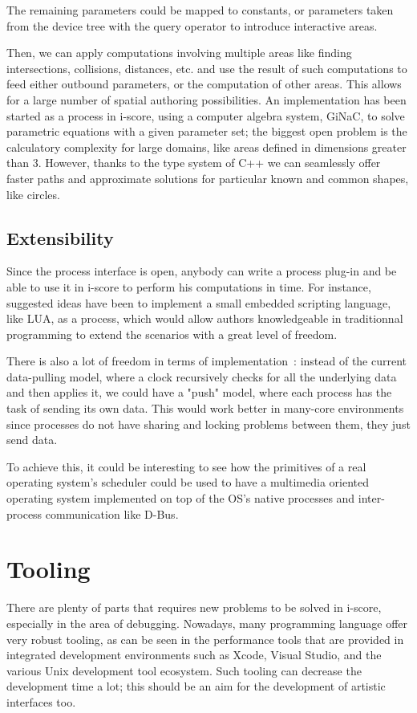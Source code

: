 \documentclass{sigchi}
\begin{document}
The remaining parameters could be mapped to constants, or parameters taken from the device tree with the query operator to introduce interactive areas.

Then, we can apply computations involving multiple areas like finding intersections, collisions, distances, etc. and use the result of such computations to feed either outbound parameters, or the computation of other areas. This allows for a large number of spatial authoring possibilities. An implementation has been started as a process in i-score, using a computer algebra system, GiNaC\cite{bauer2002introduction}, to solve parametric equations with a given parameter set; the biggest open problem is the calculatory complexity for large domains, like areas defined in dimensions greater than 3. However, thanks to the type system of C++ we can seamlessly offer faster paths and approximate solutions for particular known and common shapes, like circles.

\subsection{Extensibility}
Since the process interface is open, anybody can write a process plug-in and be able to use it in i-score to perform his computations in time. For instance, suggested ideas have been to implement a small embedded scripting language, like LUA, as a process, which would allow authors knowledgeable in traditionnal programming to extend the scenarios with a great level of freedom.

There is also a lot of freedom in terms of implementation~: instead of the current data-pulling model, where a clock recursively checks for all the underlying data and then applies it, we could have a "push" model, where each process has the task of sending its own data. This would work better in many-core environments since processes do not have sharing and locking problems between them, they just send data.

To achieve this, it could be interesting to see how the primitives of a real operating system's scheduler could be used to have a multimedia oriented operating system implemented on top of the OS's native processes and inter-process communication like D-Bus.

\section{Tooling}
There are plenty of parts that requires new problems to be solved in i-score, especially in the area of debugging. Nowadays, many programming language offer very robust tooling, as can be seen in the performance tools that are provided in integrated development environments such as Xcode, Visual Studio, and the various Unix development tool ecosystem\cite{spinellis2014software}. Such tooling can decrease the development time a lot; this should be an aim for the development of artistic interfaces too.
\end{document}
